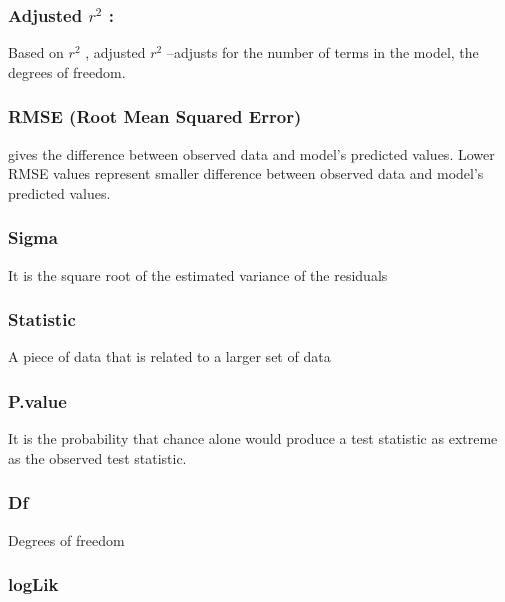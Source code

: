 \documentclass[10pt,letterpaper]{article}
\begin{document}
\hypertarget{adjusted-r2}{%
\subsubsection{\texorpdfstring{Adjusted \(r^2\)
:}{Adjusted r\^{}2 :}}\label{adjusted-r2}}

Based on \(r^2\) , adjusted \(r^2\) --adjusts for the number of terms in
the model, the degrees of freedom.

\hypertarget{rmse-root-mean-squared-error}{%
\subsubsection{RMSE (Root Mean Squared
Error)}\label{rmse-root-mean-squared-error}}

gives the difference between observed data and model's predicted values.
Lower RMSE values represent smaller difference between observed data and
model's predicted values.

\hypertarget{sigma}{%
\subsubsection{Sigma}\label{sigma}}

It is the square root of the estimated variance of the residuals

\hypertarget{statistic}{%
\subsubsection{Statistic}\label{statistic}}

A piece of data that is related to a larger set of data

\hypertarget{p.value}{%
\subsubsection{P.value}\label{p.value}}

It is the probability that chance alone would produce a test statistic
as extreme as the observed test statistic.

\hypertarget{df}{%
\subsubsection{Df}\label{df}}

Degrees of freedom

\hypertarget{loglik}{%
\subsubsection{logLik}\label{loglik}}
\end{document}
